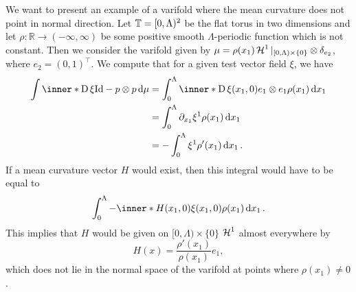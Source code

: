 \begin{example}
	\label{mean_curvature_vector_does_not_have_to_point_in_normal_direction}
	We want to present an example of a varifold where the mean curvature does 
	not point in normal direction.
	Let $ \operatorname{\mathbb{T}} = [ 0 , \Lambda )^{ 2 } $ be the flat torus in two 
	dimensions and let $ \rho \colon \mathbb{ R } \to (-\infty, \infty ) $ be 
	some positive smooth $\Lambda$-periodic function which is not constant. 
	Then we consider the varifold given by $ \mu = \rho ( x_{ 1 } ) \operatorname{\mathcal{H}}^{ 1 } 
	|_{ [ 0 , \Lambda ) \times \{ 0 \} } \otimes \delta_{ e_{ 2 } } $, where $ 
	e_{ 2 } = ( 0 , 1 )^{ \top } $. We 
	compute that for a given test vector field $ \xi $, we have
	\begin{align*}
		\int
		\inner*{ \diff \xi }{ \mathrm{Id} - p \otimes p }
		\dd{ \mu }
		& =
		\int_{ 0 }^{ \Lambda }
		\inner*{ \diff \xi ( x_{ 1 } , 0 ) }{ e_{ 1 } \otimes e_{ 1 } }
		\rho ( x_{ 1 } )
		\dd{ x_{ 1 } }
		\\
		& = 
		\int_{ 0 }^{ \Lambda }
		\partial_{ x_{ 1 } } \xi^{ 1 } \rho ( x_{ 1 } )
		\dd{ x_{ 1 } }
		\\
		& =
		-
		\int_{ 0 }^{ \Lambda }
		\xi^{ 1 }
		\rho' ( x_{ 1 } )
		\dd{ x_{ 1 } }.
	\end{align*}
	If a mean curvature vector $ H $ would exist, then this integral would have 
	to be equal to
	\begin{equation*}
		\int_{ 0 }^{ \Lambda }
			-\inner*{ H ( x_{ 1 } , 0 ) }{ \xi ( x_{ 1 } , 0 )  }
			\rho ( x_{ 1 } )
		\dd{ x_{ 1 } }.
	\end{equation*}
	This implies that $ H $ would be given on $ [ 0 , \Lambda ) \times \{ 0 \} 
	$ $ 
	\operatorname{\mathcal{H}}^{ 1 } $ almost everywhere by 
	\begin{equation*}
		H ( x ) = \frac{ \rho' ( x_{ 1 } ) }{ \rho ( x_{ 1 } ) } e_{ 1 },
	\end{equation*}
	which does not lie in the normal space of the varifold at points where $ 
	\rho ( x_{ 1 } ) \neq 0 $.
\end{example}